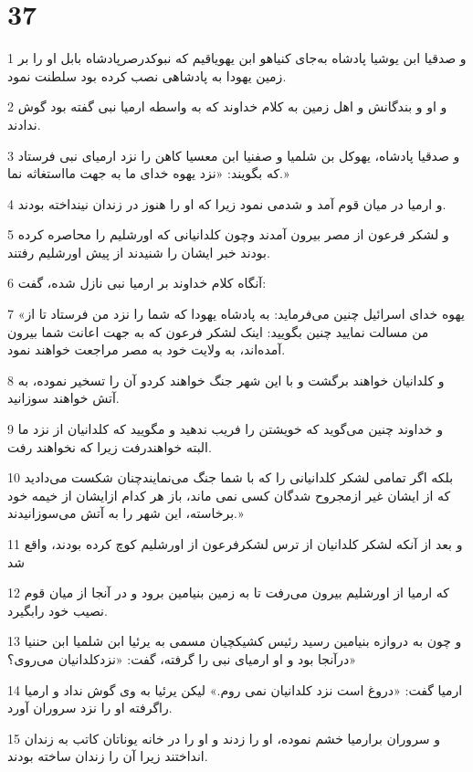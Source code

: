 \chapter{37}

\par 1 و صدقیا ابن یوشیا پادشاه به‌جای کنیاهو ابن یهویاقیم که نبوکدرصرپادشاه بابل او را بر زمین یهودا به پادشاهی نصب کرده بود سلطنت نمود.
\par 2 و او و بندگانش و اهل زمین به کلام خداوند که به واسطه ارمیا نبی گفته بود گوش ندادند.
\par 3 و صدقیا پادشاه، یهوکل بن شلمیا و صفنیا ابن معسیا کاهن را نزد ارمیای نبی فرستاد که بگویند: «نزد یهوه خدای ما به جهت مااستغاثه نما.»
\par 4 و ارمیا در میان قوم آمد و شدمی نمود زیرا که او را هنوز در زندان نینداخته بودند.
\par 5 و لشکر فرعون از مصر بیرون آمدند وچون کلدانیانی که اورشلیم را محاصره کرده بودند خبر ایشان را شنیدند از پیش اورشلیم رفتند.
\par 6 آنگاه کلام خداوند بر ارمیا نبی نازل شده، گفت:
\par 7 «یهوه خدای اسرائیل چنین می‌فرماید: به پادشاه یهودا که شما را نزد من فرستاد تا از من مسالت نمایید چنین بگویید: اینک لشکر فرعون که به جهت اعانت شما بیرون آمده‌اند، به ولایت خود به مصر مراجعت خواهند نمود.
\par 8 و کلدانیان خواهند برگشت و با این شهر جنگ خواهند کردو آن را تسخیر نموده، به آتش خواهند سوزانید.
\par 9 و خداوند چنین می‌گوید که خویشتن را فریب ندهید و مگویید که کلدانیان از نزد ما البته خواهندرفت زیرا که نخواهند رفت.
\par 10 بلکه اگر تمامی لشکر کلدانیانی را که با شما جنگ می‌نمایندچنان شکست می‌دادید که از ایشان غیر ازمجروح شدگان کسی نمی ماند، باز هر کدام ازایشان از خیمه خود برخاسته، این شهر را به آتش می‌سوزانیدند.»
\par 11 و بعد از آنکه لشکر کلدانیان از ترس لشکرفرعون از اورشلیم کوچ کرده بودند، واقع شد
\par 12 که ارمیا از اورشلیم بیرون می‌رفت تا به زمین بنیامین برود و در آنجا از میان قوم نصیب خود رابگیرد.
\par 13 و چون به دروازه بنیامین رسید رئیس کشیکچیان مسمی به یرئیا ابن شلمیا ابن حننیا درآنجا بود و او ارمیای نبی را گرفته، گفت: «نزدکلدانیان می‌روی؟»
\par 14 ارمیا گفت: «دروغ است نزد کلدانیان نمی روم.» لیکن یرئیا به وی گوش نداد و ارمیا راگرفته او را نزد سروران آورد.
\par 15 و سروران برارمیا خشم نموده، او را زدند و او را در خانه یوناتان کاتب به زندان انداختند زیرا آن را زندان ساخته بودند.
